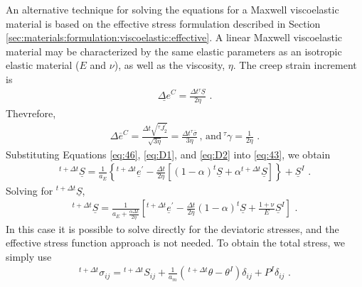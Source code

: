 An alternative technique for solving the equations for a Maxwell viscoelastic
material is based on the effective stress formulation described in
Section \vref{sec:materials:formulation:viscoelastic:effective}. A linear
Maxwell viscoelastic material may be characterized by the same elastic
parameters as an isotropic elastic material ($E$ and $\nu$), as
well as the viscosity, $\eta$. The creep strain increment is
\begin{gather}
\underline{\Delta e}^{C}=\frac{\Delta t\phantom{}^{\tau}\underline{S}}{2\eta}\,\,.\label{eq:D1}
\end{gather}
Thevrefore,
\begin{gather}
\Delta\overline{e}^{C}=\frac{\Delta t\sqrt{^{\tau}J_{2}^{\prime}}}{\sqrt{3\eta}}=\frac{\Delta t\phantom{}^{\tau}\overline{\sigma}}{3\eta}\,,\,\mathrm{and}\,^{\tau}\gamma=\frac{1}{2\eta}\,\,.\label{eq:D2}
\end{gather}
Substituting Equations \vref{eq:46}, \vref{eq:D1}, and \vref{eq:D2}
into \vref{eq:43}, we obtain
\begin{gather}
^{t+\Delta t}\underline{S}=\frac{1}{a_{E}}\left\{ ^{t+\Delta t}\underline{e}^{\prime}-\frac{\Delta t}{2\eta}\left[(1-\alpha)^{t}\underline{S}+\alpha\phantom{}^{t+\Delta t}\underline{S}\right]\right\} +\underline{S}^{I}\,\,.\label{eq:D3}
\end{gather}
Solving for $^{t+\Delta t}\underline{S}$,
\begin{gather}
^{t+\Delta t}\underline{S}=\frac{1}{a_{E}+\frac{\alpha\Delta t}{2\eta}}\left[^{t+\Delta t}\underline{e}^{\prime}-\frac{\Delta t}{2\eta}(1-\alpha)^{t}\underline{S}+\frac{1+\mathrm{\nu}}{E}\underline{S}^{I}\right]\,\,.\label{eq:D4}
\end{gather}
In this case it is possible to solve directly for the deviatoric stresses,
and the effective stress function approach is not needed. To obtain
the total stress, we simply use
\begin{gather}
^{t+\Delta t}\sigma_{ij}=\phantom{}^{t+\Delta t}S_{ij}+\frac{\mathit{1}}{a_{m}}\left(\,^{t+\Delta t}\theta-\theta^{I}\right)\delta_{ij}+P^{I}\delta_{ij}\,\,.\label{eq:D5}
\end{gather}


